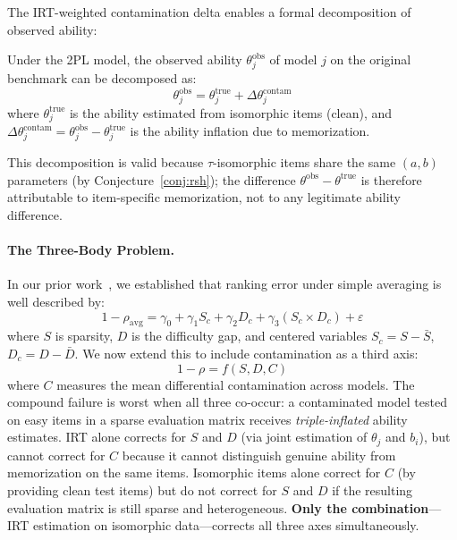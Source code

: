 The IRT-weighted contamination delta enables a formal decomposition of
observed ability:

\begin{proposition}
\label{prop:decomp}
Under the 2PL model, the observed ability $\theta^{\mathrm{obs}}_j$ of
model $j$ on the original benchmark can be decomposed as:
\begin{equation}
\theta^{\mathrm{obs}}_j = \theta^{\mathrm{true}}_j +
\Delta\theta^{\mathrm{contam}}_j
\label{eq:decomp}
\end{equation}
where $\theta^{\mathrm{true}}_j$ is the ability estimated from
isomorphic items (clean), and
$\Delta\theta^{\mathrm{contam}}_j = \theta^{\mathrm{obs}}_j -
\theta^{\mathrm{true}}_j$ is the ability inflation due to memorization.
\end{proposition}

\noindent
This decomposition is valid because $\tau$-isomorphic items share the
same $(a, b)$ parameters (by Conjecture~\ref{conj:rsh}); the difference
$\theta^{\mathrm{obs}} - \theta^{\mathrm{true}}$ is therefore
attributable to item-specific memorization, not to any legitimate
ability difference.

\paragraph{The Three-Body Problem.}
In our prior work~\cite{kang2026efsl}, we established that ranking
error under simple averaging is well described by:
\begin{equation}
1 - \rho_{\mathrm{avg}} = \gamma_0 + \gamma_1 S_c + \gamma_2 D_c +
\gamma_3 (S_c \times D_c) + \varepsilon
\label{eq:efsl}
\end{equation}
where $S$ is sparsity, $D$ is the difficulty gap, and centered variables
$S_c = S - \bar{S}$, $D_c = D - \bar{D}$. We now extend this to
include contamination as a third axis:
\begin{equation}
1 - \rho = f(S, D, C)
\label{eq:threebody}
\end{equation}
where $C$ measures the mean differential contamination across models.
The compound failure is worst when all three co-occur: a contaminated
model tested on easy items in a sparse evaluation matrix receives
\emph{triple-inflated} ability estimates. IRT alone corrects for $S$
and $D$ (via joint estimation of $\theta_j$ and $b_i$), but cannot
correct for $C$ because it cannot distinguish genuine ability from
memorization on the same items. Isomorphic items alone correct for $C$
(by providing clean test items) but do not correct for $S$ and $D$ if
the resulting evaluation matrix is still sparse and heterogeneous.
\textbf{Only the combination}---IRT estimation on isomorphic data---corrects
all three axes simultaneously.

